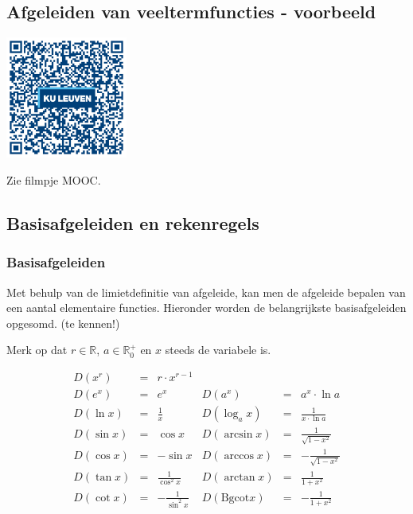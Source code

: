 \subsection{Afgeleiden van veeltermfuncties - voorbeeld}

\begin{minipage}{.25\linewidth}
	\raggedright
	\includegraphics[width=4cm]{6_afgeleiden_integralen/inputs/QR_Code_AFGVTFTIES_module6new}
\end{minipage}
\begin{minipage}{.7\linewidth}
	Zie filmpje MOOC.
\end{minipage}

\subsection{Basisafgeleiden en rekenregels}
\subsubsection{Basisafgeleiden}

Met behulp van de limietdefinitie van afgeleide, kan men de afgeleide bepalen van een aantal elementaire functies. Hieronder worden de belangrijkste basisafgeleiden opgesomd. (te kennen!)

Merk op dat $r \in \mathbb{R}$, $a \in \mathbb{R}^+_0$ en $x$ steeds de variabele is.

\begin{equation*}
\begin{array}{rclrcl}
D(x^r)&=&r\cdot x^{r-1} & & &  \\
D(e^x)&=&e^x& D(a^x)&=&a^x\cdot \ln a \\
D(\ln x)&=&\frac{1}{x}&D(\log_{a}x)&=&\frac{1}{x\cdot \ln a} \\
D(\sin x)&=&\cos x  & D(\arcsin x) &=& \frac{1}{\sqrt{1-x^2}} \\
D(\cos x)&=&-\sin x  & D(\arccos x) &=& -\frac{1}{\sqrt{1-x^2}} \\
D(\tan x)&=&\frac{1}{\cos^2 x} & D(\arctan x) &=& \frac{1}{1+x^2} \\
D(\cot x)&=&-\frac{1}{\sin^2 x} & D(\text{Bgcot} x) &=& -\frac{1}{1+x^2} \\
\end{array}
\end{equation*}

